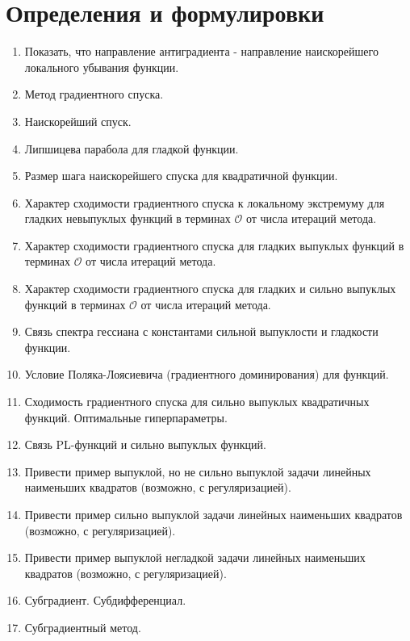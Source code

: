 \documentclass[
  letterpaper,
  DIV=11,
  numbers=noendperiod]{scrartcl}
\author{}
\date{}
\providecommand{\tightlist}{%
  \setlength{\itemsep}{0pt}\setlength{\parskip}{0pt}}\usepackage{longtable,booktabs,array}
\begin{document}
\section{Определения и
формулировки}\label{ux43eux43fux440ux435ux434ux435ux43bux435ux43dux438ux44f-ux438-ux444ux43eux440ux43cux443ux43bux438ux440ux43eux432ux43aux438}

\begin{enumerate}
\def\labelenumi{\arabic{enumi}.}
\tightlist
\item
  Показать, что направление антиградиента - направление наискорейшего
  локального убывания функции.
\item
  Метод градиентного спуска.
\item
  Наискорейший спуск.
\item
  Липшицева парабола для гладкой функции.
\item
  Размер шага наискорейшего спуска для квадратичной функции.
\item
  Характер сходимости градиентного спуска к локальному экстремуму для
  гладких невыпуклых функций в терминах \(\mathcal{O}\) от числа
  итераций метода.
\item
  Характер сходимости градиентного спуска для гладких выпуклых функций в
  терминах \(\mathcal{O}\) от числа итераций метода.
\item
  Характер сходимости градиентного спуска для гладких и сильно выпуклых
  функций в терминах \(\mathcal{O}\) от числа итераций метода.
\item
  Связь спектра гессиана с константами сильной выпуклости и гладкости
  функции.
\item
  Условие Поляка-Лоясиевича (градиентного доминирования) для функций.
\item
  Сходимость градиентного спуска для сильно выпуклых квадратичных
  функций. Оптимальные гиперпараметры.
\item
  Связь PL-функций и сильно выпуклых функций.
\item
  Привести пример выпуклой, но не сильно выпуклой задачи линейных
  наименьших квадратов (возможно, с регуляризацией).
\item
  Привести пример сильно выпуклой задачи линейных наименьших квадратов
  (возможно, с регуляризацией).
\item
  Привести пример выпуклой негладкой задачи линейных наименьших
  квадратов (возможно, с регуляризацией).
\item
  Субградиент. Субдифференциал.
\item
  Субградиентный метод.

\end{enumerate}
\end{document}
